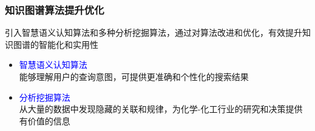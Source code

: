 \begin{frame}
	\frametitle{知识图谱算法提升优化}
	引入智慧语义认知算法和多种分析挖掘算法，通过对算法改进和优化，有效提升知识图谱的智能化和实用性
	\vskip 20pt
	\begin{itemize}
	 \setlength{\itemsep}{15pt}
		\item \textcolor{blue}{智慧语义认知算法}\\
能够理解用户的查询意图，可提供更准确和个性化的搜索结果
\item \textcolor{blue}{分析挖掘算法}\\
	从大量的数据中发现隐藏的关联和规律，为化学-化工行业的研究和决策提供有价值的信息
	\end{itemize}
\end{frame}

